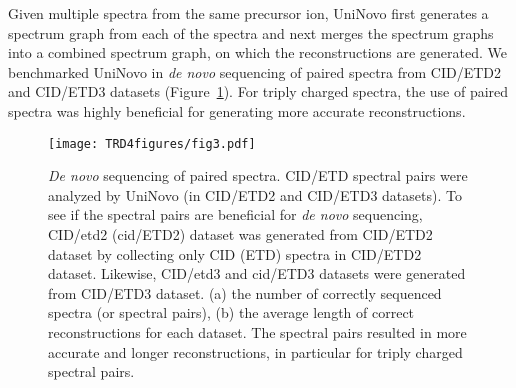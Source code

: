 Given multiple spectra from the same precursor ion, UniNovo first generates a spectrum graph from each of the spectra and next merges the spectrum graphs into a combined spectrum graph, on which the reconstructions are generated.
We benchmarked UniNovo in {\em de novo} sequencing of  paired spectra from CID/ETD2 and CID/ETD3 datasets (Figure~\ref{FIG:5}). 
%
For triply charged spectra, the use of  paired spectra was highly beneficial for generating more accurate reconstructions. 


\begin{figure}[!tpb]
\centerline{\texttt{[image: TRD4figures/fig3.pdf]}}
\caption{\footnotesize   {\em De novo} sequencing of  paired spectra. CID/ETD  spectral pairs were analyzed by UniNovo (in CID/ETD2 and CID/ETD3 datasets). To see if the spectral pairs are beneficial for {\em de novo} sequencing, CID/etd2 (cid/ETD2) dataset was generated from CID/ETD2 dataset by collecting only CID (ETD) spectra in CID/ETD2 dataset. Likewise, CID/etd3 and cid/ETD3 datasets were generated from CID/ETD3 dataset. (a) the number of correctly sequenced spectra (or spectral pairs), (b) the average length of correct reconstructions for each dataset. The spectral pairs resulted in more accurate and longer reconstructions, in particular for triply charged spectral pairs.  }\label{FIG:5}
\end{figure}


